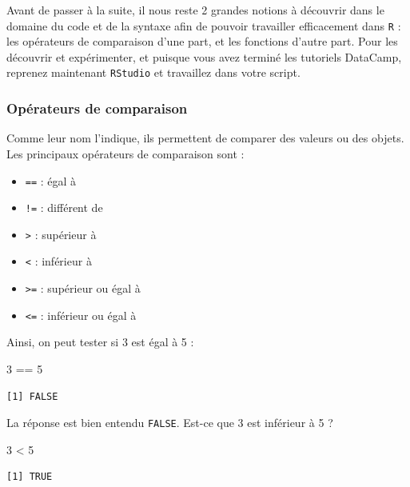 \documentclass[
  a4paper,
  DIV=11,
  numbers=noendperiod,
  oneside]{scrreprt}
\newenvironment{Shaded}{}{}
\newcommand{\DecValTok}[1]{\textcolor[rgb]{0.00,0.36,0.77}{#1}}
\newcommand{\SpecialCharTok}[1]{\textcolor[rgb]{0.00,0.36,0.77}{#1}}
\providecommand{\tightlist}{%
  \setlength{\itemsep}{0pt}\setlength{\parskip}{0pt}}\usepackage{longtable,booktabs,array}
\begin{document}
Avant de passer à la suite, il nous reste 2 grandes notions à découvrir
dans le domaine du code et de la syntaxe afin de pouvoir travailler
efficacement dans \texttt{R} : les opérateurs de comparaison d'une part,
et les fonctions d'autre part. Pour les découvrir et expérimenter, et
puisque vous avez terminé les tutoriels DataCamp, reprenez maintenant
\texttt{RStudio} et travaillez dans votre script.

\subsubsection{Opérateurs de comparaison}\label{sec-comparaison}

Comme leur nom l'indique, ils permettent de comparer des valeurs ou des
objets. Les principaux opérateurs de comparaison sont :

\begin{itemize}
\tightlist
\item
  \texttt{==} : égal à
\item
  \texttt{!=} : différent de
\item
  \texttt{\textgreater{}} : supérieur à
\item
  \texttt{\textless{}} : inférieur à
\item
  \texttt{\textgreater{}=} : supérieur ou égal à
\item
  \texttt{\textless{}=} : inférieur ou égal à
\end{itemize}

Ainsi, on peut tester si 3 est égal à 5 :

\begin{Shaded}
\begin{Highlighting}[]
\DecValTok{3} \SpecialCharTok{==} \DecValTok{5}
\end{Highlighting}
\end{Shaded}

\begin{verbatim}
[1] FALSE
\end{verbatim}

La réponse est bien entendu \texttt{FALSE}. Est-ce que 3 est inférieur à
5 ?

\begin{Shaded}
\begin{Highlighting}[]
\DecValTok{3} \SpecialCharTok{\textless{}} \DecValTok{5}
\end{Highlighting}
\end{Shaded}

\begin{verbatim}
[1] TRUE
\end{verbatim}
\end{document}

